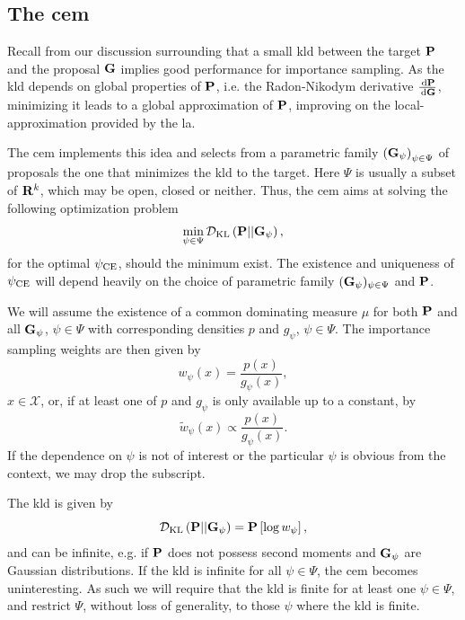 \subsection{The \texorpdfstring{\Acrfull{cem}}{Cross-Entropy method}}
\label{subsec:cem}
Recall from our discussion surrounding  that a small \gls{kld} between the target $\P$ and the proposal $\G$ implies good performance for importance sampling. As the \gls{kld} depends on global properties of $\P$, i.e. the Radon-Nikodym derivative $\rnd{\P}{\G}$, minimizing it leads to a global approximation of $\P$, improving on the local-approximation provided by the \gls{la}.

The \gls{cem} \citep{Rubinstein1999CrossEntropy,Rubinstein2004CrossEntropy} implements this idea and selects from a parametric family $ \left( \G_{\psi} \right)_{\psi \in \Psi}$ of proposals the one that minimizes the \gls{kld} to the target. Here $\Psi$ is usually a subset of $\R^{k}$, which may be open, closed or neither. Thus, the \gls{cem} aims at solving the following optimization problem
$$
    \min_{\psi \in \Psi} \Dkl{\P}{\G_{\psi}},
$$
for the optimal $\pce$, should the minimum exist. The existence and uniqueness of $\pce$ will depend heavily on the choice of parametric family $(\G_{\psi})_{\psi \in \Psi}$ and $\P$. 

We will assume the existence of a common dominating measure $\mu$ for both $\P$ and all $\G_{\psi}$, $\psi \in \Psi$ with corresponding densities $p$ and $g_{\psi}$, $\psi \in \Psi$. The importance sampling weights are then given by 
$$
w_{\psi}(x) = \frac{p(x)}{g_{\psi}(x)},
$$
$x \in \mathcal X$, or, if at least one of $p$ and $g_\psi$ is only available up to a constant, by 
$$
\tilde w_{\psi} (x) \propto \frac{p(x)}{g_{\psi}(x)}.
$$
If the dependence on $\psi$ is not of interest or the particular $\psi$ is obvious from the context, we may drop the subscript. 

The \gls{kld} is given by 
$$
    \Dkl{\P}{\G_{\psi}} = \P \left[ \log w_{\psi} \right],
$$
and can be infinite, e.g. if $\P$ does not possess second moments and $\G_{\psi}$ are Gaussian distributions. If the \gls{kld} is infinite for all $\psi\in\Psi$, the \gls{cem} becomes uninteresting. As such we will require that the \gls{kld} is finite for at least one $\psi \in \Psi$, and restrict $\Psi$, without loss of generality, to those $\psi$ where the \gls{kld} is finite. 

